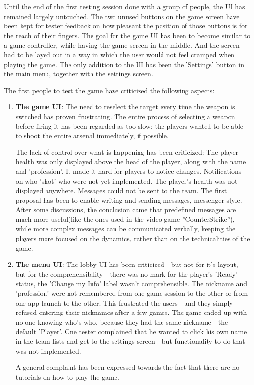 Until the end of the first testing session done with a group of people, the UI
has remained largely untouched. The two unused buttons on the game screen have
been kept for tester feedback on how pleasant the position of those buttons is
for the reach of their fingers. The goal for the game UI has been to become
similar to a game controller, while having the game screen in the middle. And
the screen had to be layed out in a way in which the user would not feel cramped
when playing the game. The only addition to the UI has been the 'Settings'
button in the main menu, together with the settings screen.\newline

The first people to test the game have criticized the following aspects:
\begin{enumerate}
  \item \textbf {The game UI}: The need to reselect the target every time the
  weapon is switched has proven frustrating. The entire process of selecting
  a weapon before firing it has been regarded as too slow: the players wanted to
  be able to shoot the entire arsenal immediately, if possible.\newline
     
  The lack of control over what is happening has been criticized: The player
  health was only displayed above the head of the player, along with the name
  and 'profession'. It made it hard for players to notice changes. Notifications
  on who 'shot' who were not yet implemented. The player's health was not
  displayed anywhere. Messages could not be sent to the team. The first proposal
  has been to enable writing and sending messages, messenger style. After some
  discussions, the conclusion came that predefined messages are much more
  useful(like the ones used in the video game ''CounterStrike''), while more
  complex messages can be communicated verbally, keeping the players more
  focused on the dynamics, rather than on the technicalities of the game.
  
  \item \textbf{The menu UI}: The lobby UI has been criticized - but not for
  it's layout, but for the comprehensibility - there was no mark for the
  player's 'Ready' status, the 'Change my Info' label wasn't comprehensible. The
  nickname and 'profession' were not remembered from one game session to the
  other or from one app launch to the other. This frustrated the users - and
  they simply refused entering their nicknames after a few games. The game ended
  up with no one knowing who's who, because they had the same nickname - the
  default 'Player'. One tester complained that he wanted to click his own name
  in the team lists and get to the settings screen - but functionality
  to do that was not implemented.\newline
  
  A general complaint has been expressed towards the fact that there are no
  tutorials on how to play the game.
\end{enumerate}

